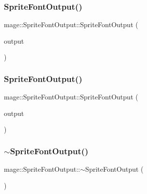 \subsubsection{\texorpdfstring{Sprite\+Font\+Output()}{SpriteFontOutput()}\hspace{0.1cm}{\footnotesize\ttfamily [2/3]}}
{\footnotesize\ttfamily mage\+::\+Sprite\+Font\+Output\+::\+Sprite\+Font\+Output (\begin{DoxyParamCaption}\item[{const \hyperlink{structmage_1_1_sprite_font_output}{Sprite\+Font\+Output} \&}]{output }\end{DoxyParamCaption})\hspace{0.3cm}{\ttfamily [delete]}}

\hypertarget{structmage_1_1_sprite_font_output_ac7dbae468f4e14c2a41860c1ca4a05f6}{}\label{structmage_1_1_sprite_font_output_ac7dbae468f4e14c2a41860c1ca4a05f6} 
\subsubsection{\texorpdfstring{Sprite\+Font\+Output()}{SpriteFontOutput()}\hspace{0.1cm}{\footnotesize\ttfamily [3/3]}}
{\footnotesize\ttfamily mage\+::\+Sprite\+Font\+Output\+::\+Sprite\+Font\+Output (\begin{DoxyParamCaption}\item[{\hyperlink{structmage_1_1_sprite_font_output}{Sprite\+Font\+Output} \&\&}]{output }\end{DoxyParamCaption})\hspace{0.3cm}{\ttfamily [default]}}

\hypertarget{structmage_1_1_sprite_font_output_ab0793582b679667ff018eda962b77f6a}{}\label{structmage_1_1_sprite_font_output_ab0793582b679667ff018eda962b77f6a} 
\subsubsection{\texorpdfstring{$\sim$\+Sprite\+Font\+Output()}{~SpriteFontOutput()}}
{\footnotesize\ttfamily mage\+::\+Sprite\+Font\+Output\+::$\sim$\+Sprite\+Font\+Output (\begin{DoxyParamCaption}{ }\end{DoxyParamCaption})\hspace{0.3cm}{\ttfamily [default]}}



